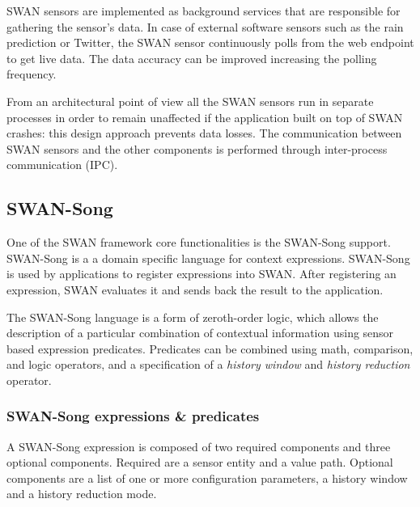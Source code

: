 SWAN sensors are implemented as background services that are responsible for gathering the sensor's data. In case of external software sensors such as the rain prediction or Twitter, the SWAN sensor continuously polls from the web endpoint to get live data. The data accuracy can be improved increasing the polling frequency. 

From an architectural point of view all the SWAN sensors run in separate processes in order to remain unaffected if the application built on top of SWAN crashes: this design approach prevents data losses. The communication between SWAN sensors and the other components is performed through inter-process communication (IPC).

\subsection{SWAN-Song}
One of the SWAN framework core functionalities is the SWAN-Song support. SWAN-Song \cite{swansong} is a a domain specific language
for context expressions. SWAN-Song is used by applications to register expressions into SWAN. After registering an expression, SWAN evaluates it and sends back the result to the application. 

The SWAN-Song language is a form of zeroth-order logic, which allows the description of a particular combination of contextual information using sensor based expression predicates. Predicates can be combined using math, comparison, and logic operators, and a specification of a \emph{history window} and \emph{history reduction} operator.  

\subsubsection{SWAN-Song expressions \& predicates}
A SWAN-Song expression is composed of two required components and three optional components. Required are a sensor entity and a value path. Optional components are a list of one or more configuration parameters, a history window and a history reduction mode.

